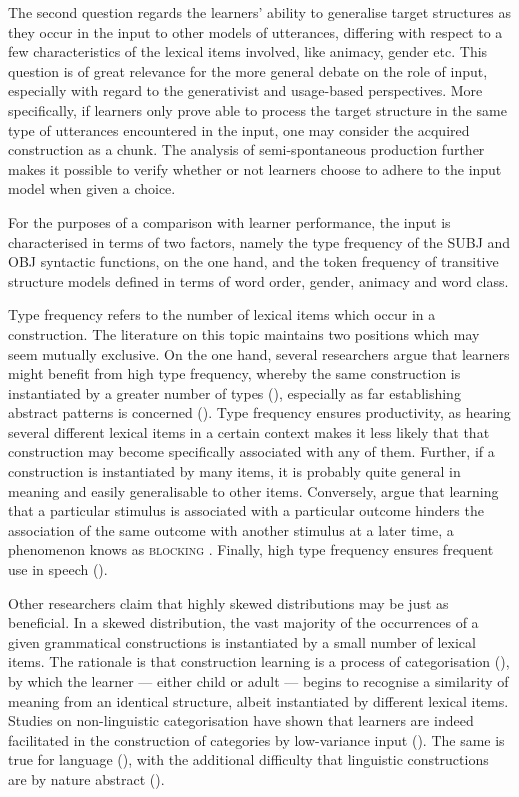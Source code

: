 The second question regards the learners’ ability to generalise target structures as they occur in the input to other models of utterances, differing with respect to a few characteristics of the lexical items involved, like animacy, gender etc. This question is of great relevance for the more general debate on the role of input, especially with regard to the generativist and usage-based perspectives. More specifically, if learners only prove able to process the target structure in the same type of utterances encountered in the input, one may consider the acquired construction as a chunk. The analysis of semi-spontaneous production further makes it possible to verify whether or not learners choose to adhere to the input model when given a choice.

For the purposes of a comparison with learner performance, the input is characterised in terms of two factors, namely the type frequency of the SUBJ and OBJ syntactic functions, on the one hand, and the token frequency of transitive structure models defined in terms of word order, gender, animacy and word class.

Type frequency refers to the number of lexical items which occur in a construction. The literature on this topic maintains two positions which may seem mutually exclusive. On the one hand, several researchers argue that learners might benefit from high type frequency, whereby the same construction is instantiated by a greater number of types (\citealt{Bybee1985, Bybee1995, Bybee2000, Bybee2006, GoldbergCasenhiserEtAl2004, OnnisEtAl2008}), especially as far establishing abstract patterns is concerned (\citealt{McdonoughKim2009}). Type frequency ensures productivity, as hearing several different lexical items in a certain context makes it less likely that that construction may become specifically associated with any of them. Further, if a construction is instantiated by many items, it is probably quite general in meaning and easily generalisable to other items. Conversely, \citet{KruschkeBlair2000} argue that learning that a particular stimulus is associated with a particular outcome hinders the association of the same outcome with another stimulus at a later time, a phenomenon knows as \textsc{blocking} \citep{Ellis2006a}. Finally, high type frequency ensures frequent use in speech (\citealt{BybeeThompson2000}).

Other researchers claim that highly skewed distributions may be just as beneficial. In a skewed distribution, the vast majority of the occurrences of a given grammatical constructions is instantiated by a small number of lexical items. The rationale is that construction learning is a process of categorisation (\citealt{GoldbergCasenhiserEtAl2007}), by which the learner — either child or adult — begins to recognise a similarity of meaning from an identical structure, albeit instantiated by different lexical items. Studies on non-linguistic categorisation have shown that learners are indeed facilitated in the construction of categories by low-variance input (\citealt{GentnerEtAl2007, Casasola2005}). The same is true for language (\citealt{CasenhiserGoldberg2005, MaguireEtAl2008}), with the additional difficulty that linguistic constructions are by nature abstract (\citealt{GentnerMedina1998}). 

